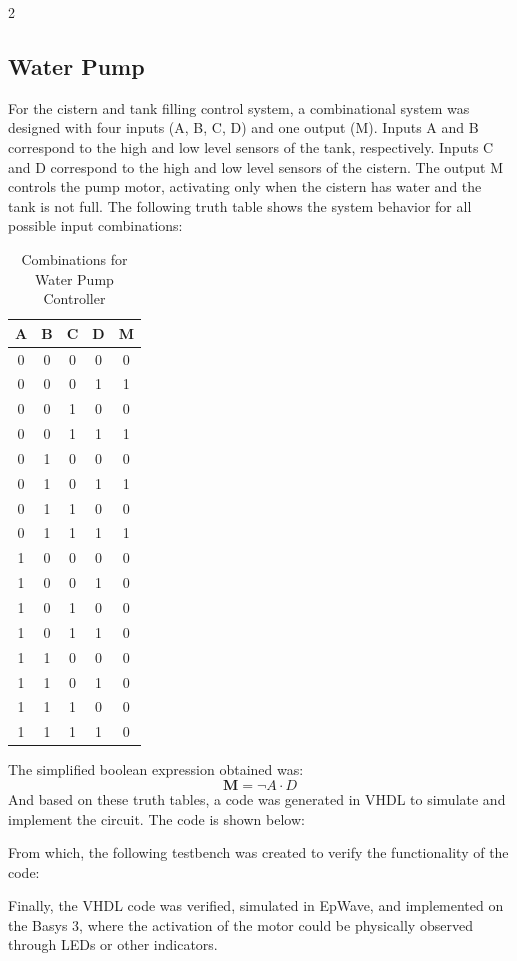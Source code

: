 \documentclass{article}
\begin{document}
\begin{multicols}{2}
\subsection{Water Pump}\label{Cisterna}
For the cistern and tank filling control system, a combinational system was designed with four inputs (A, B, C, D) and one output (M). Inputs A and B correspond to the high and low level sensors of the tank, respectively. Inputs C and D correspond to the high and low level sensors of the cistern. The output M controls the pump motor, activating only when the cistern has water and the tank is not full. The following truth table shows the system behavior for all possible input combinations: 

\begin{table}[H]
\centering
\begin{tabular}{|c|c|c|c|c|}
\hline
\textbf{A} & \textbf{B} & \textbf{C} & \textbf{D} & \textbf{M} \\ \hline
0 & 0 & 0 & 0 & 0 \\
0 & 0 & 0 & 1 & 1 \\
0 & 0 & 1 & 0 & 0 \\
0 & 0 & 1 & 1 & 1 \\
0 & 1 & 0 & 0 & 0 \\
0 & 1 & 0 & 1 & 1 \\
0 & 1 & 1 & 0 & 0 \\
0 & 1 & 1 & 1 & 1 \\
1 & 0 & 0 & 0 & 0 \\
1 & 0 & 0 & 1 & 0 \\
1 & 0 & 1 & 0 & 0 \\
1 & 0 & 1 & 1 & 0 \\
1 & 1 & 0 & 0 & 0 \\
1 & 1 & 0 & 1 & 0 \\
1 & 1 & 1 & 0 & 0 \\
1 & 1 & 1 & 1 & 0 \\ \hline
\end{tabular}
\caption{Combinations for Water Pump Controller }
\label{tab:water_pump}
\end{table}

The simplified boolean expression obtained was: 
\begin{equation}
  \mathbf{M} = \neg A \cdot D
\end{equation}
And based on these truth tables, a code was generated in VHDL to simulate and implement the circuit. The code is shown below:

From which, the following testbench was created to verify the functionality of the code:

Finally, the VHDL code was verified, simulated in EpWave, and implemented on the Basys 3, where the activation of the motor could be physically observed through LEDs or other indicators. 


\end{multicols}
\end{document}

